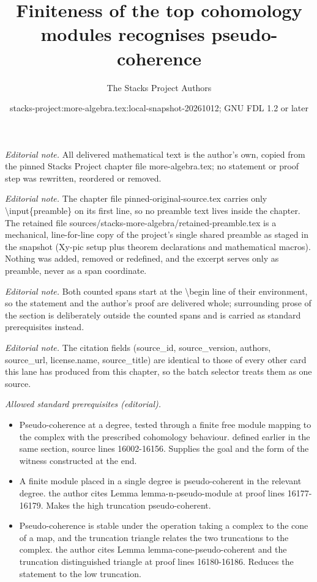 \documentclass[10pt,a4paper]{amsart}
\title{Finiteness of the top cohomology modules recognises pseudo-coherence}
\author{The Stacks Project Authors}
\date{stacks-project:more-algebra.tex:local-snapshot-20261012; GNU FDL 1.2 or later}
\theoremstyle{plain}
\theoremstyle{definition}
\theoremstyle{remark}
\numberwithin{equation}{subsection}
\begin{document}
\maketitle
\setcounter{subsection}{1}
\noindent\textit{Editorial note.} All delivered mathematical text is the author's own, copied from the pinned Stacks Project chapter file more-algebra.tex; no statement or proof step was rewritten, reordered or removed.\par\medskip
\noindent\textit{Editorial note.} The chapter file pinned-original-source.tex carries only \textbackslash{}input\{preamble\} on its first line, so no preamble text lives inside the chapter. The retained file sources/stacks-more-algebra/retained-preamble.tex is a mechanical, line-for-line copy of the project's single shared preamble as staged in the snapshot (Xy-pic setup plus theorem declarations and mathematical macros). Nothing was added, removed or redefined, and the excerpt serves only as preamble, never as a span coordinate.\par\medskip
\noindent\textit{Editorial note.} Both counted spans start at the \textbackslash{}begin line of their environment, so the statement and the author's proof are delivered whole; surrounding prose of the section is deliberately outside the counted spans and is carried as standard prerequisites instead.\par\medskip
\noindent\textit{Editorial note.} The citation fields (source\_id, source\_version, authors, source\_url, license.name, source\_title) are identical to those of every other card this lane has produced from this chapter, so the batch selector treats them as one source.\par\medskip
\noindent\textit{Allowed standard prerequisites (editorial).}\begin{itemize}
\item Pseudo-coherence at a degree, tested through a finite free module mapping to the complex with the prescribed cohomology behaviour. defined earlier in the same section, source lines 16002-16156. Supplies the goal and the form of the witness constructed at the end.
\item A finite module placed in a single degree is pseudo-coherent in the relevant degree. the author cites Lemma lemma-n-pseudo-module at proof lines 16177-16179. Makes the high truncation pseudo-coherent.
\item Pseudo-coherence is stable under the operation taking a complex to the cone of a map, and the truncation triangle relates the two truncations to the complex. the author cites Lemma lemma-cone-pseudo-coherent and the truncation distinguished triangle at proof lines 16180-16186. Reduces the statement to the low truncation.
\end{itemize}\medskip
\end{document}
